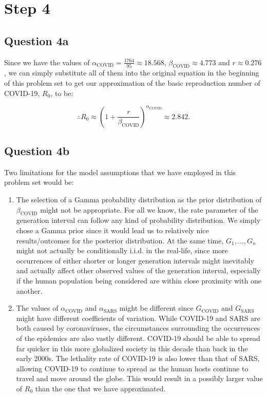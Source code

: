\documentclass[11pt,fancychapters]{article}
\begin{document}
\section*{Step 4}

\subsection*{Question 4a}

Since we have the values of $\alpha_\text{COVID} = \frac{1764}{95} \approx 18.568$, $\beta_\text{COVID} \approx 4.773$ and $r \approx 0.276$, we can simply substitute all of them into the original equation in the beginning of this problem set to get our approximation of the basic reproduction number of COVID-19, $R_0$, to be:

\begin{tcolorbox}
\begin{equation}\label{eqn4a1}
    \therefore R_0 \approx \left( 1 + \frac{r}{\beta_\text{COVID}} \right)^{\alpha_\text{COVID}} \approx 2.842.
\end{equation}
\end{tcolorbox}

\subsection*{Question 4b}

Two limitations for the model assumptions that we have employed in this problem set would be:

\begin{enumerate}
    \item The selection of a Gamma probability distribution as the prior distribution of $\beta_\text{COVID}$ might not be appropriate. For all we know, the rate parameter of the generation interval can follow any kind of probability distribution. We simply chose a Gamma prior since it would lead us to relatively nice results/outcomes for the posterior distribution. At the same time, $G_1, \dots, G_n$ might not actually be conditionally i.i.d. in the real-life, since more occurrences of either shorter or longer generation intervals might inevitably and actually affect other observed values of the generation interval, especially if the human population being considered are within close proximity with one another.
    \item The values of $\alpha_\text{COVID}$ and $\alpha_\text{SARS}$ might be different since $G_\text{COVID}$ and $G_\text{SARS}$ might have different coefficients of variation. While COVID-19 and SARS are both caused by coronaviruses, the circumstances surrounding the occurrences of the epidemics are also vastly different. COVID-19 should be able to spread far quicker in this more globalized society in this decade than back in the early 2000s. The lethality rate of COVID-19 is also lower than that of SARS, allowing COVID-19 to continue to spread as the human hosts continue to travel and move around the globe. This would result in a possibly larger value of $R_0$ than the one that we have approximated.
\end{enumerate}
\end{document}
